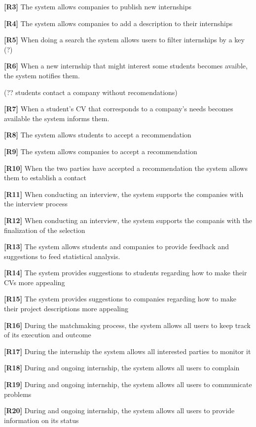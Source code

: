 \textbf{[R3]} The system allows companies to publish new internships

\textbf{[R4]} The system allows companies to add a description to their internships

\textbf{[R5]} When doing a search the system allows users to filter internships by a key (?)

\textbf{[R6]} When a new internship that might interest some students becomes avaible, the system notifies them.

(?? students contact a company without recomendations)

\textbf{[R7]} When a student's CV that corresponds to a company's needs becomes available the system informs them. 

\textbf{[R8]} The system allows students to accept a recommendation

\textbf{[R9]} The system allows companies to accept a recommendation 

\textbf{[R10] }  When the two parties have accepted a recommendation the system allows them to establish a contact

\textbf{[R11]} When conducting an interview, the system supports the companies with the interview process

\textbf{[R12]} When conducting an interview, the system supports the companis with the finalization of the selection

\textbf{[R13]} The system allows students and companies to provide feedback and suggestions to feed statistical analysis.

\textbf{[R14] }The system provides suggestions to students regarding how to make their CVs more appealing

\textbf{[R15]} The system provides suggestions to companies regarding how to make their project descriptions more appealing

\textbf{[R16]} During the matchmaking process, the system allows all users to keep track of its execution and outcome

\textbf{[R17]} During the internship the system allows all interested parties to monitor it

\textbf{[R18]} During and ongoing internship, the system allows all users to complain 

\textbf{[R19]} During and ongoing internship, the system allows all users to communicate problems 

\textbf{[R20]} During and ongoing internship, the system allows all users to provide information on its status

